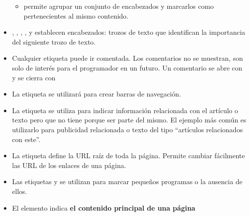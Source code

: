 \documentclass[letterpaper,10pt,spanish]{sphinxmanual}
\begin{document}
\begin{itemize}
\begin{itemize}
\item {} 
 permite agrupar un conjunto de encabezados y marcarlos como pertenecientes al mismo contenido.

\end{itemize}

\item {} 
, , , ,  y  establecen encabezados: trozos de texto que identifican la importancia del siguiente trozo de texto.

\item {} 
Cualquier etiqueta puede ir comentada. Los comentarios no se muestran, son solo de interés para el programador en un futuro. Un comentario se abre con \sphinxcode{\textless{}!-{-}} y se cierra con \sphinxcode{-{-}\textgreater{}}

\item {} 
La etiqueta  se utilizará para crear barras de navegación.

\item {} 
La etiqueta  se utiliza para indicar información relacionada con el artículo o texto pero que no tiene porque ser parte del mismo. El ejemplo más común es utilizarlo para publicidad relacionada o texto del tipo ``artículos relacionados con este''.

\item {} 
La etiqueta  define la URL raíz de toda la página. Permite cambiar fácilmente las URL de los enlaces de una página.

\item {} 
Las etiquetas  y  se utilizan para marcar pequeños programas o la ausencia de ellos.

\item {} 
El elemento  indica \textbf{el contenido principal de una página}

\end{itemize}
\end{document}
